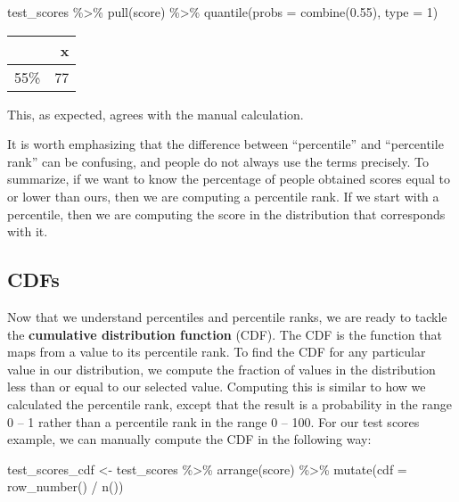 \documentclass[
]{book}
\newenvironment{Shaded}{\begin{snugshade}}{\end{snugshade}}
\newcommand{\AttributeTok}[1]{\textcolor[rgb]{0.77,0.63,0.00}{#1}}
\newcommand{\DecValTok}[1]{\textcolor[rgb]{0.00,0.00,0.81}{#1}}
\newcommand{\FloatTok}[1]{\textcolor[rgb]{0.00,0.00,0.81}{#1}}
\newcommand{\FunctionTok}[1]{\textcolor[rgb]{0.00,0.00,0.00}{#1}}
\newcommand{\NormalTok}[1]{#1}
\newcommand{\OtherTok}[1]{\textcolor[rgb]{0.56,0.35,0.01}{#1}}
\newcommand{\SpecialCharTok}[1]{\textcolor[rgb]{0.00,0.00,0.00}{#1}}
\begin{document}
\begin{Shaded}
\begin{Highlighting}[]
\NormalTok{test\_scores }\SpecialCharTok{\%\textgreater{}\%}
  \FunctionTok{pull}\NormalTok{(score) }\SpecialCharTok{\%\textgreater{}\%}
  \FunctionTok{quantile}\NormalTok{(}\AttributeTok{probs =} \FunctionTok{combine}\NormalTok{(}\FloatTok{0.55}\NormalTok{), }\AttributeTok{type =} \DecValTok{1}\NormalTok{)}
\end{Highlighting}
\end{Shaded}

\begin{table}
\centering
\begin{tabular}{l|r}
\hline
  & x\\
\hline
55\% & 77\\
\hline
\end{tabular}
\end{table}

This, as expected, agrees with the manual calculation.

It is worth emphasizing that the difference between ``percentile'' and ``percentile rank'' can be confusing, and people do not always use the terms precisely.
To summarize, if we want to know the percentage of people obtained scores equal to or lower than ours, then we are computing a percentile rank.
If we start with a percentile, then we are computing the score in the distribution that corresponds with it.

\hypertarget{cdfs}{%
\subsection{CDFs}\label{cdfs}}

Now that we understand percentiles and percentile ranks, we are ready to tackle the \textbf{cumulative distribution function} (CDF).
The CDF is the function that maps from a value to its percentile rank.
To find the CDF for any particular value in our distribution, we compute the fraction of values in the distribution less than or equal to our selected value.
Computing this is similar to how we calculated the percentile rank, except that the result is a probability in the range 0 -- 1 rather than a percentile rank in the range 0 -- 100.
For our test scores example, we can manually compute the CDF in the following way:

\begin{Shaded}
\begin{Highlighting}[]
\NormalTok{test\_scores\_cdf }\OtherTok{\textless{}{-}}\NormalTok{ test\_scores }\SpecialCharTok{\%\textgreater{}\%}
  \FunctionTok{arrange}\NormalTok{(score) }\SpecialCharTok{\%\textgreater{}\%}
  \FunctionTok{mutate}\NormalTok{(}\AttributeTok{cdf =} \FunctionTok{row\_number}\NormalTok{() }\SpecialCharTok{/} \FunctionTok{n}\NormalTok{())}
\end{Highlighting}
\end{Shaded}
\end{document}
